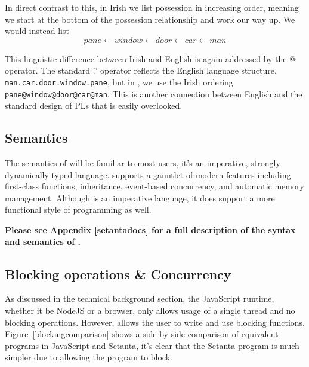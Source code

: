 In direct contrast to this, in Irish we list possession in increasing order, meaning we start at the bottom of the possession relationship and work our way up. We would instead list
\[pane \leftarrow window \leftarrow door \leftarrow car \leftarrow man\]

This linguistic difference between Irish and English is again addressed by the @ operator. The standard '.' operator reflects the English language structure, \verb|man.car.door.window.pane|, but in \Setanta{}, we use the Irish ordering \verb|pane@window@door@car@man|. This is another connection between English and the standard design of PLs that is easily overlooked.

\subsection{Semantics}

The semantics of \Setanta{} will be familiar to most users, it's an imperative, strongly dynamically typed language. \Setanta{} supports a gauntlet of modern features including first-class functions, inheritance, event-based concurrency, and automatic memory management. Although \Setanta{} is an imperative language, it does support a more functional style of programming as well.

        \noindent\textbf{Please see \hyperref[setantadocs]{Appendix \ref*{setantadocs}} for a full description of the syntax and semantics of \Setanta{}.}

\subsection{Blocking operations \& Concurrency}
\label{solution:blocking-concurrency}

As discussed in the technical background section, the JavaScript runtime, whether it be NodeJS or a browser, only allows usage of a single thread and no blocking operations.
However, \Setanta{} allows the user to write and use blocking functions. Figure~\ref{blockingcomparison} shows a side by side comparison of equivalent programs in JavaScript and Setanta, it's clear that the Setanta program is much simpler due to allowing the program to block.

